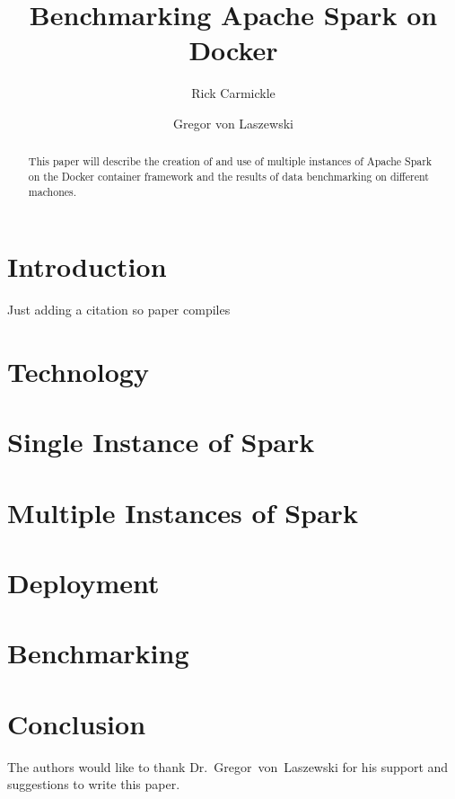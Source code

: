 
\title{Benchmarking Apache Spark on Docker}


\author{Rick Carmickle}

\author{Gregor von Laszewski}


\renewcommand{\shortauthors}{G. v. Laszewski}


\begin{abstract}
This paper will describe the creation of and use of multiple instances of Apache Spark
on the Docker container framework and the results of data benchmarking on different machones. 
\end{abstract}



\maketitle




\section{Introduction}

Just adding a citation so paper compiles~\cite{las-example00}

\section{Technology}


\section{Single Instance of Spark}


\section{Multiple Instances of Spark}


\section{Deployment}


\section{Benchmarking}


\section{Conclusion}



\begin{acks}

  The authors would like to thank Dr.~Gregor~von~Laszewski for his
  support and suggestions to write this paper.

\end{acks}


 

